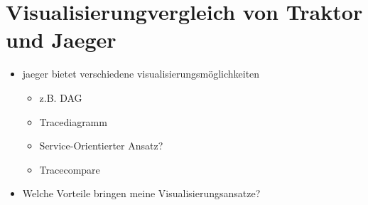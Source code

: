 \section{Visualisierungvergleich von Traktor und Jaeger}
\label{section:Visualisierungvergleich von Traktor und Jaeger}
\begin{itemize}
	\item jaeger bietet verschiedene visualisierungsmöglichkeiten
	\begin{itemize}
		\item z.B. DAG
		\item Tracediagramm
		\item Service-Orientierter Ansatz?
		\item Tracecompare
	\end{itemize}
	\item Welche Vorteile bringen meine Visualisierungsansatze?
	
\end{itemize}
